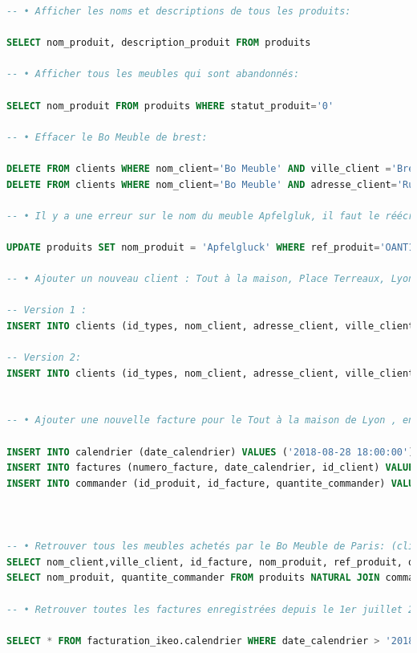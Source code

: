 \documentclass[french]{article}
\begin{document}
\begin{lstlisting}[language=sql]
-- • Afficher les noms et descriptions de tous les produits:

SELECT nom_produit, description_produit FROM produits 

-- • Afficher tous les meubles qui sont abandonnés:

SELECT nom_produit FROM produits WHERE statut_produit='0' 

-- • Effacer le Bo Meuble de brest:

DELETE FROM clients WHERE nom_client='Bo Meuble' AND ville_client ='Brest' 
DELETE FROM clients WHERE nom_client='Bo Meuble' AND adresse_client='Rue Jean Jaurès' AND ville_client ='Brest' AND pays_client='France'

-- • Il y a une erreur sur le nom du meuble Apfelgluk, il faut le réécrire Apfelgluck:

UPDATE produits SET nom_produit = 'Apfelgluck' WHERE ref_produit='OANT12'

-- • Ajouter un nouveau client : Tout à la maison, Place Terreaux, Lyon:

-- Version 1 :
INSERT INTO clients (id_types, nom_client, adresse_client, ville_client, pays_client) VALUES ('1', 'Tout à la maison', 'Place Terreaux', 'Lyon', 'France')

-- Version 2:
INSERT INTO clients (id_types, nom_client, adresse_client, ville_client, pays_client) VALUES ((SELECT id_types FROM types WHERE nom_types='Magasin'), 'Tout à la maison', 'Place Terreaux', 'Lyon', 'France')


-- • Ajouter une nouvelle facture pour le Tout à la maison de Lyon , enregistrée le 28/08/2018, à 18h: (La commande est composé de 18 Naess)     

INSERT INTO calendrier (date_calendrier) VALUES ('2018-08-28 18:00:00')
INSERT INTO factures (numero_facture, date_calendrier, id_client) VALUES ('MSQ298', '2018-08-28 18:00:00', (SELECT id_client FROM clients WHERE nom_client = "Tout à la maison" AND ville_client = "Lyon"))
INSERT INTO commander (id_produit, id_facture, quantite_commander) VALUES ((SELECT id_produit FROM produits WHERE nom_produit = "Naess"), (SELECT id_facture FROM factures WHERE numero_facture = 'MSQ297'), 18)



-- • Retrouver tous les meubles achetés par le Bo Meuble de Paris: (clients, factures, calendrier)
SELECT nom_client,ville_client, id_facture, nom_produit, ref_produit, quantite_commander FROM clients NATURAL JOIN factures NATURAL JOIN commander NATURAL JOIN produits WHERE nom_client='Bo Meuble' AND ville_client='Paris'
SELECT nom_produit, quantite_commander FROM produits NATURAL JOIN commander NATURAL JOIN factures WHERE id_client= '1'

-- • Retrouver toutes les factures enregistrées depuis le 1er juillet 2018:

SELECT * FROM facturation_ikeo.calendrier WHERE date_calendrier > '2018-07-01 00:00:00'
\end{lstlisting}
\end{document}
